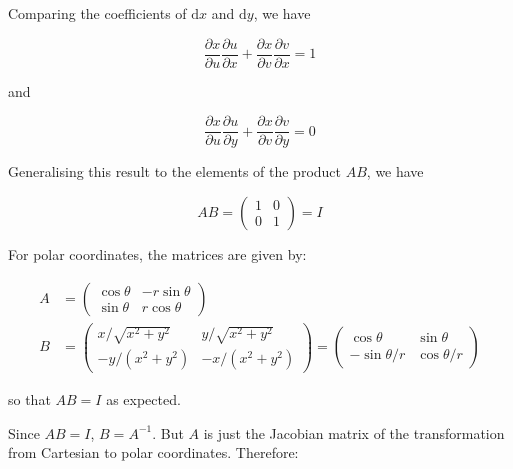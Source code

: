 \documentclass[12pt]{article}
\begin{document}
Comparing the coefficients of $\mathrm{d}x$ and $\mathrm{d}y$, we have

\begin{equation}
    \frac{\partial x}{\partial u} \frac{\partial u}{\partial x} + \frac{\partial x}{\partial v} \frac{\partial v}{\partial x} = 1
\end{equation}

and

\begin{equation}
    \frac{\partial x}{\partial u} \frac{\partial u}{\partial y} + \frac{\partial x}{\partial v} \frac{\partial v}{\partial y} = 0
\end{equation}

Generalising this result to the elements of the product $AB$, we have

\begin{equation}
    AB =
    \begin{pmatrix}
        1 & 0 \\
        0 & 1
    \end{pmatrix}
    =
    I
\end{equation}

For polar coordinates, the matrices are given by:

\begin{equation}
    \begin{split}
        A &=
        \begin{pmatrix}
            \cos{\theta} & -r\sin{\theta} \\
            \sin{\theta} & r\cos{\theta}
        \end{pmatrix} \\
        B &=
        \begin{pmatrix}
            x/\sqrt{x^{2} + y^{2}} & y/\sqrt{x^{2} + y^{2}} \\
            -y/(x^{2} + y^{2})     & -x/(x^{2} + y^{2})
        \end{pmatrix}
        =
        \begin{pmatrix}
            \cos{\theta}    & \sin{\theta}   \\
            -\sin{\theta}/r & \cos{\theta}/r
        \end{pmatrix}
    \end{split}
\end{equation}

so that $AB = I$ as expected.

Since $AB = I$, $B = A^{-1}$. But $A$ is just the Jacobian matrix of the transformation from Cartesian to polar coordinates. Therefore:
\end{document}
